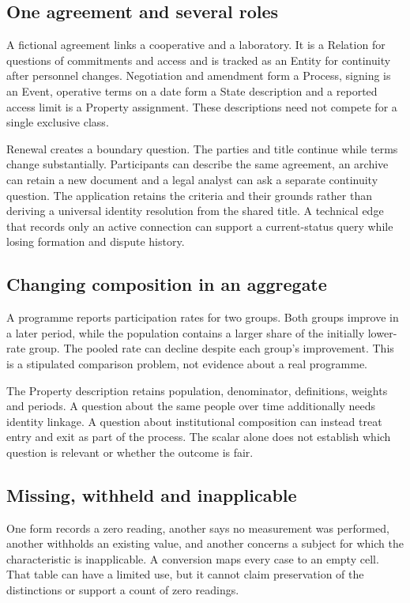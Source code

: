 \documentclass[11pt,a4paper]{article}
\begin{document}
\subsection{One agreement and several roles}
A fictional agreement links a cooperative and a laboratory. It is a Relation for questions of commitments and access and is tracked as an Entity for continuity after personnel changes. Negotiation and amendment form a Process, signing is an Event, operative terms on a date form a State description and a reported access limit is a Property assignment. These descriptions need not compete for a single exclusive class.

Renewal creates a boundary question. The parties and title continue while terms change substantially. Participants can describe the same agreement, an archive can retain a new document and a legal analyst can ask a separate continuity question. The application retains the criteria and their grounds rather than deriving a universal identity resolution from the shared title. A technical edge that records only an active connection can support a current-status query while losing formation and dispute history.

\subsection{Changing composition in an aggregate}
A programme reports participation rates for two groups. Both groups improve in a later period, while the population contains a larger share of the initially lower-rate group. The pooled rate can decline despite each group's improvement. This is a stipulated comparison problem, not evidence about a real programme.

The Property description retains population, denominator, definitions, weights and periods. A question about the same people over time additionally needs identity linkage. A question about institutional composition can instead treat entry and exit as part of the process. The scalar alone does not establish which question is relevant or whether the outcome is fair.

\subsection{Missing, withheld and inapplicable}
One form records a zero reading, another says no measurement was performed, another withholds an existing value, and another concerns a subject for which the characteristic is inapplicable. A conversion maps every case to an empty cell. That table can have a limited use, but it cannot claim preservation of the distinctions or support a count of zero readings.
\end{document}
